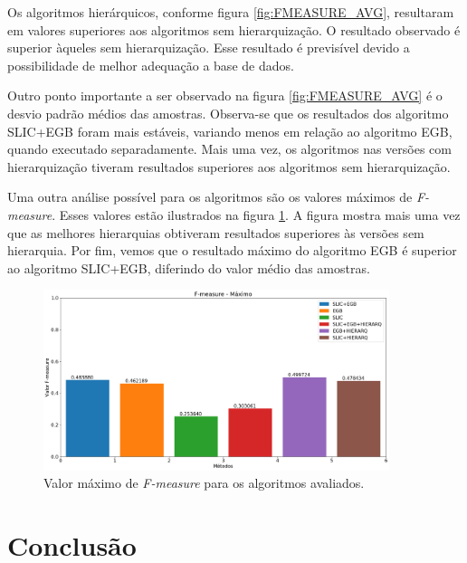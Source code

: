 \begin{document}
Os algoritmos hierárquicos, conforme figura \ref{fig:FMEASURE_AVG}, resultaram em valores superiores aos algoritmos sem hierarquização. O resultado observado é superior àqueles sem hierarquização. Esse resultado é previsível devido a possibilidade de melhor adequação a base de dados.

Outro ponto importante a ser observado na figura \ref{fig:FMEASURE_AVG} é o desvio padrão médios das amostras. Observa-se que os resultados dos algoritmo SLIC+EGB foram mais estáveis, variando menos em relação ao algoritmo EGB, quando executado separadamente. Mais uma vez, os algoritmos nas versões com hierarquização tiveram resultados superiores aos algoritmos sem hierarquização.

Uma outra análise possível para os algoritmos são os valores máximos de \textit{F-measure}. Esses valores estão ilustrados na figura \ref{fig:FMEASURE_MAX}. A figura mostra mais uma vez que as melhores hierarquias obtiveram resultados superiores às versões sem hierarquia. Por fim, vemos que o resultado máximo do algoritmo EGB é superior ao algoritmo SLIC+EGB, diferindo do valor médio das amostras.

\begin{figure}[ht]
\centering
\includegraphics[width=0.9\textwidth]{fmeasure_max.png}
\caption{Valor máximo de \textit{F-measure} para os algoritmos avaliados.}
\label{fig:FMEASURE_MAX}
\end{figure}



\section{Conclusão} \label{sec:conclusao}
\end{document}

